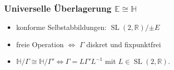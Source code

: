 \documentclass{beamer}
\newcommand{\R}{\mathbb{R}}
\newcommand{\E}{\mathbb{E}}
\begin{document}
    \begin{frame}
        \frametitle{Universelle Überlagerung $\E \cong \mathbb{H}$}
        \begin{itemize}
            \item konforme Selbstabbildungen: $\operatorname{SL}(2, \R)/{\pm E}$
            \item freie Operation $\Leftrightarrow$ $\Gamma$ diskret und fixpunktfrei
            \item $\mathbb{H}/\Gamma \cong \mathbb{H}/\Gamma' \Leftrightarrow \Gamma = L\Gamma'L^{-1}$ mit $L \in \operatorname{SL}(2,\R)$. 
        \end{itemize}
    \end{frame}
\end{document}
